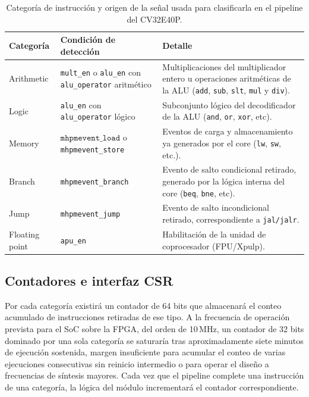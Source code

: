 \begin{table}[H]
\caption{Categoría de instrucción y origen de la señal usada para
clasificarla en el pipeline del CV32E40P.}
\label{tab:senales_clas}
\centering
\begin{tabularx}{\textwidth}{p{2.7cm}p{4.3cm}X}
\toprule
\textbf{Categoría} & \textbf{Condición de detección} & \textbf{Detalle} \\
\midrule
Arithmetic     & \texttt{mult\_en} o \texttt{alu\_en} con \texttt{alu\_operator} aritmético &
Multiplicaciones del multiplicador entero u operaciones aritméticas de la ALU
(\texttt{add}, \texttt{sub}, \texttt{slt}, \texttt{mul} y \texttt{div}). \\
Logic          & \texttt{alu\_en} con \texttt{alu\_operator} lógico &
Subconjunto lógico del decodificador de la ALU
(\texttt{and}, \texttt{or}, \texttt{xor}, etc). \\
Memory         & \(\texttt{mhpmevent\_load}\) o \texttt{mhpmevent\_store} &
Eventos de carga y almacenamiento ya generados por el core
(\texttt{lw}, \texttt{sw}, etc.). \\
Branch         & \texttt{mhpmevent\_branch} &
Evento de salto condicional retirado, generado por la lógica interna del core (\texttt{beq}, \texttt{bne}, etc). \\
Jump           & \texttt{mhpmevent\_jump} &
Evento de salto incondicional retirado, correspondiente a \texttt{jal/jalr}. \\
Floating point & \texttt{apu\_en} &
Habilitación de la unidad de coprocesador (FPU/Xpulp). \\
\bottomrule
\end{tabularx}
\end{table}

\subsection{Contadores e interfaz CSR}
\label{sec:contadores_csr}

Por cada categoría existirá un contador de 64 bits que almacenará el conteo
acumulado de instrucciones retiradas de ese tipo. A la frecuencia de operación
prevista para el SoC sobre la FPGA, del orden de 10\,MHz, un contador de
32 bits dominado por una sola categoría se saturaría tras aproximadamente
siete minutos de ejecución sostenida, margen insuficiente para acumular el
conteo de varias ejecuciones consecutivas sin reinicio intermedio o para
operar el diseño a frecuencias de síntesis mayores. Cada vez que el pipeline complete una instrucción de una
categoría, la lógica del módulo incrementará el contador correspondiente.

